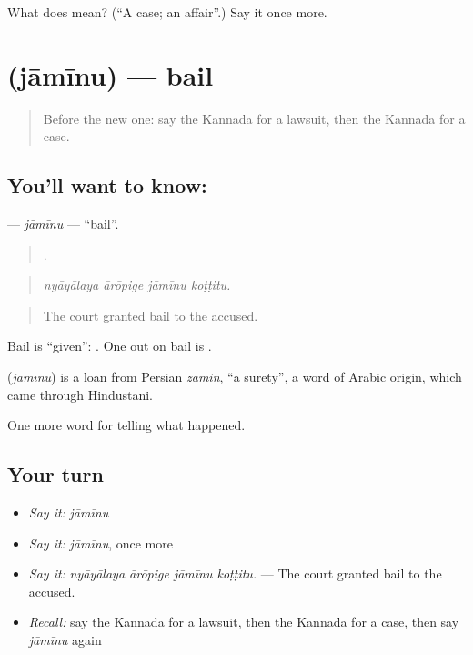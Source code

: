 \begin{tcolorbox}[breakable,colback=teal!4,colframe=teal!35!black,title={Before you move on}]
What does  mean? (\textquotedblleft{}A case; an affair\textquotedblright{}.) Say it once more.
\end{tcolorbox}
\section[\texorpdfstring{\kn{ಜಾಮೀನು} (jāmīnu)}{ಜಾಮೀನು (jāmīnu)}]{ (jāmīnu) — bail}

\label{lesson:KA-C358-jaminu}



\begin{quote}
Before the new one: say the Kannada for a lawsuit, then the Kannada for a case.
\end{quote}

\subsection*{You'll want to know: }
\textbf{} — \emph{jāmīnu} — \textquotedblleft{}bail\textquotedblright{}.

\begin{quote}
   .
\end{quote}

\begin{quote}
\emph{nyāyālaya ārōpige jāmīnu koṭṭitu.}
\end{quote}

\begin{quote}
The court granted bail to the accused.
\end{quote}

Bail is \textquotedblleft{}given\textquotedblright{}:  . One out on bail is   .

\begin{cousinweb}
\textbf{} (\emph{jāmīnu}) is a loan from Persian \emph{zāmin}, \textquotedblleft{}a surety\textquotedblright{}, a word of Arabic origin, which came through Hindustani.
\end{cousinweb}

\begin{grammarlens}[title={What you've built}]
One more word for telling what happened.
\end{grammarlens}

\subsection*{Your turn}
\begin{itemize}
\raggedright
  \item \emph{Say it:} \emph{jāmīnu}
  \item \emph{Say it:} \emph{jāmīnu}, once more
  \item \emph{Say it:} \emph{nyāyālaya ārōpige jāmīnu koṭṭitu.} — The court granted bail to the accused.
  \item \emph{Recall:} say the Kannada for a lawsuit, then the Kannada for a case, then say \emph{jāmīnu} again
\end{itemize}

